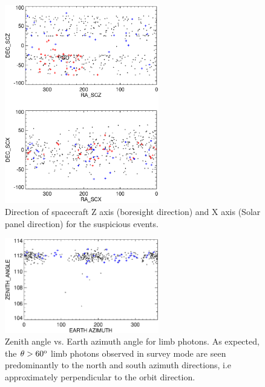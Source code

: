 \documentclass[aps,twocolumn,prd,superscriptaddress,showpacs,nofootinbib,fixfloat]{revtex4}
\newcommand{\degree}{^{\rm o}}
\begin{document}
\begin{figure}[p]
\centering
\includegraphics[width=0.6\textwidth]{plots/spacecraft-zx.ps}
\caption{Direction of spacecraft Z axis (boresight direction) and X axis
(Solar panel direction) for the suspicious events.
}
\label{fig:spacecraft-zx}
\end{figure}

\begin{figure}[p]
\centering
\includegraphics[width=0.6\textwidth]{plots/earth-az.ps}
\caption{Zenith angle vs. Earth azimuth angle for limb photons.  As expected,
  the $\theta > 60\degree$ limb photons observed in survey mode are seen
  predominantly to the north and south azimuth directions, i.e approximately
  perpendicular to the orbit direction.  }
\label{fig:earth-az}
\end{figure}
\end{document}
